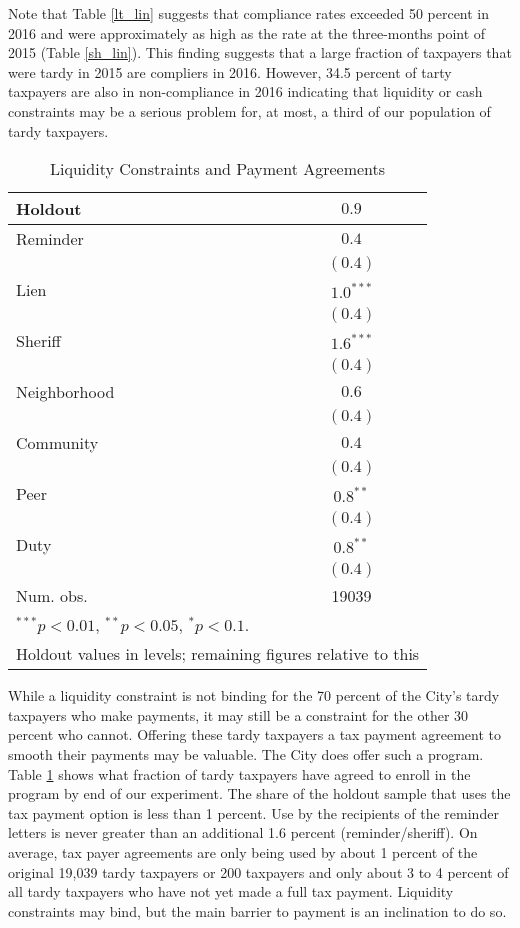 \documentclass[12pt]{article}
\begin{document}
Note that Table \ref{lt_lin} suggests that compliance rates exceeded 50 percent in 2016 and were
approximately as high as the rate at the three-months point of
2015 (Table \ref{sh_lin}). This finding suggests that a large fraction of taxpayers that
were tardy in 2015 are compliers in 2016. However, 34.5 percent of
tarty taxpayers are also in non-compliance in 2016 indicating
that liquidity or cash constraints may be a serious problem for, at
most, a third of our population of tardy taxpayers.

\begin{table}[htbp]
\caption{Liquidity Constraints and Payment Agreements}\label{payment}
\begin{center}
\begin{tabular}{l c }
\hline
Holdout      & $0.9$ \\
\hline
Reminder     & $0.4$       \\
             & $(0.4)$     \\
Lien         & $1.0^{***}$ \\
             & $(0.4)$     \\
Sheriff      & $1.6^{***}$ \\
             & $(0.4)$     \\
Neighborhood & $0.6$       \\
             & $(0.4)$     \\
Community    & $0.4$       \\
             & $(0.4)$     \\
Peer         & $0.8^{**}$  \\
             & $(0.4)$     \\
Duty         & $0.8^{**}$  \\
             & $(0.4)$     \\
\hline
Num. obs.    & 19039       \\
\hline
\multicolumn{2}{l}{$^{***}p<0.01$, $^{**}p<0.05$, $^*p<0.1$. } \\
\multicolumn{2}{l}{Holdout values in levels; remaining figures relative to this}
\end{tabular}
\end{center}
\end{table}

While a liquidity constraint is not binding for the 70 percent of the
City's tardy taxpayers who make payments, it may still be a constraint
for the other 30 percent who cannot.  Offering these tardy taxpayers a
tax payment agreement to smooth their payments may be valuable.  The
City does offer such a program.  Table \ref{payment} shows what
fraction of tardy taxpayers have agreed to enroll in the program by
end of our experiment.  The share of the holdout sample that uses the
tax payment option is less than 1 percent.  Use by the recipients of
the reminder letters is never greater than an additional 1.6 percent
(reminder/sheriff).  On average, tax payer agreements are only being
used by about 1 percent of the original 19,039 tardy taxpayers or 200
taxpayers and only about 3 to 4 percent of all tardy taxpayers who
have not yet made a full tax payment.  Liquidity constraints may bind,
but the main barrier to payment is an inclination to do so.
\end{document}
